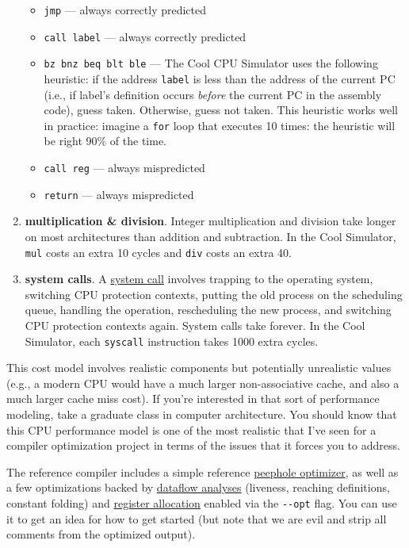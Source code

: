 \documentclass[]{article}
\begin{document}
\begin{enumerate}
  \begin{itemize}
  \itemsep1pt\parskip0pt
  \item
    \texttt{jmp} --- always correctly predicted
  \item
    \texttt{call label} --- always correctly predicted
  \item
    \texttt{bz bnz beq blt ble} --- The Cool CPU Simulator uses the
    following heuristic: if the address \texttt{label} is less than the
    address of the current PC (i.e., if label's definition occurs
    \emph{before} the current PC in the assembly code), guess taken.
    Otherwise, guess not taken. This heuristic works well in practice:
    imagine a \texttt{for} loop that executes 10 times: the heuristic
    will be right 90\% of the time.
  \item
    \texttt{call reg} --- always mispredicted
  \item
    \texttt{return} --- always mispredicted
  \end{itemize}
\item
  \textbf{multiplication \& division}. Integer multiplication and
  division take longer on most architectures than addition and
  subtraction. In the Cool Simulator, \texttt{mul} costs an extra 10
  cycles and \texttt{div} costs an extra 40.
\item
  \textbf{system calls}. A
  \href{http://en.wikipedia.org/wiki/System_call}{system call} involves
  trapping to the operating system, switching CPU protection contexts,
  putting the old process on the scheduling queue, handling the
  operation, rescheduling the new process, and switching CPU protection
  contexts again. System calls take forever. In the Cool Simulator, each
  \texttt{syscall} instruction takes 1000 extra cycles.
\end{enumerate}

This cost model involves realistic components but potentially
unrealistic values (e.g., a modern CPU would have a much larger
non-associative cache, and also a much larger cache miss cost). If
you're interested in that sort of performance modeling, take a graduate
class in computer architecture. You should know that this CPU
performance model is one of the most realistic that I've seen for a
compiler optimization project in terms of the issues that it forces you
to address.

The reference compiler includes a simple reference
\href{http://en.wikipedia.org/wiki/Peephole_optimization}{peephole
optimizer}, as well as a few optimizations backed by
\href{http://en.wikipedia.org/wiki/Data-flow_analysis}{dataflow
analyses} (liveness, reaching definitions, constant folding) and
\href{http://en.wikipedia.org/wiki/Register_allocation}{register
allocation} enabled via the \texttt{-{}-opt} flag. You can use it to get
an idea for how to get started (but note that we are evil and strip all
comments from the optimized output).
\end{document}
